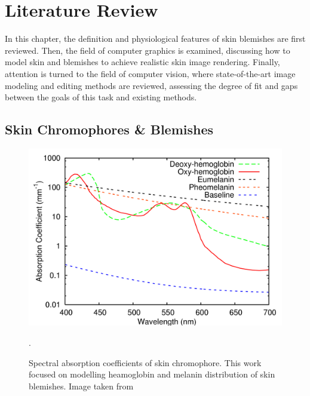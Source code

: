 
\chapter{Literature Review}
\begin{spacing}{1.5}
\setlength{\parskip}{0.3in}

In this chapter, the definition and physiological features of skin blemishes are first reviewed. Then, the field of computer graphics is examined, discussing how to model skin and blemishes to achieve realistic skin image rendering. Finally, attention is turned to the field of computer vision, where state-of-the-art image modeling and editing methods are reviewed, assessing the degree of fit and gaps between the goals of this task and existing methods.

\section{Skin Chromophores \& Blemishes}
\begin{figure}[t!]
    \centering
    \includegraphics[width=\columnwidth]{Chapter2/HM_abs.png}
    \caption{Spectral absorption coefficients of skin chromophore. This work focused on modelling heamoglobin and melanin distribution of skin blemishes. Image taken from\cite{10.5555/2383894.2383946}}.
    \label{fig:hm_abs}
\end{figure}


\end{spacing}

